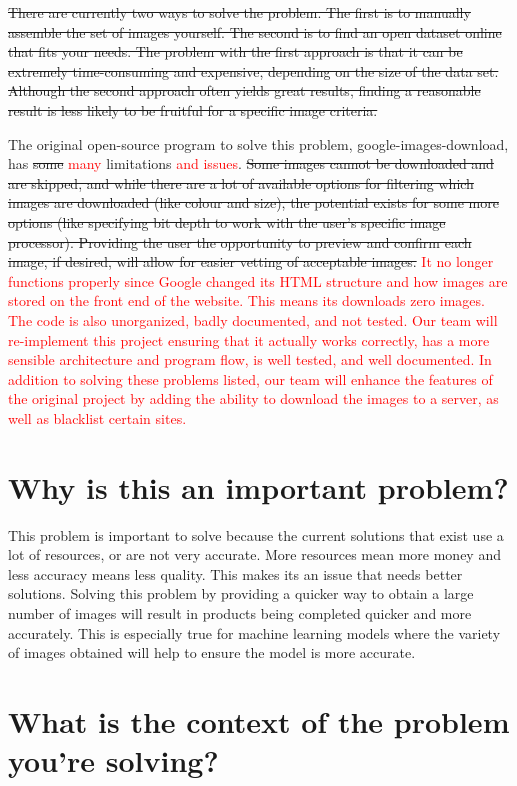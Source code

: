 \documentclass{article}
\begin{document}
\sout{There are currently two ways to solve the problem. The first is to manually assemble the set of images yourself. 
The second is to find an open dataset online that fits your needs. The problem with the first approach is that 
it can be extremely time-consuming and expensive, depending on the size of the data set. Although the second 
approach often yields great results, finding a reasonable result is less likely to be fruitful for a specific 
image criteria.}

The original open-source program to solve this problem, google-images-download, has \sout{some} \textcolor{red}{many} 
limitations \textcolor{red}{and issues}. 
\sout{Some images cannot be downloaded and are skipped, and while there are a lot of available options for filtering 
which images are downloaded (like colour and size), the potential exists for some more options (like specifying 
bit depth to work with the user’s specific image processor). Providing the user the opportunity to preview 
and confirm each image, if desired, will allow for easier vetting of acceptable images.}
\textcolor{red}{It no longer functions properly since Google changed its HTML structure and how images are
stored on the front end of the website. This means its downloads zero images. The code is also unorganized, badly
documented, and not tested. Our team will re-implement this project ensuring that it actually works correctly, has a more 
sensible architecture and program flow, is well tested, and well documented. In addition to solving these problems listed,
our team will enhance the features of the original project by adding the ability to download the images to a server, 
as well as blacklist certain sites.}

\section* {Why is this an important problem?}

This problem is important to solve because the current solutions that exist use a lot of resources, or are not 
very accurate. More resources mean more money and less accuracy means less quality. This makes its an issue that 
needs better solutions. Solving this problem by providing a quicker way to obtain a large number of images will 
result in products being completed quicker and more accurately. This is especially true for machine learning models 
where the variety of images obtained will help to ensure the model is more accurate.

\section* {What is the context of the problem you’re solving?}
\end{document}
